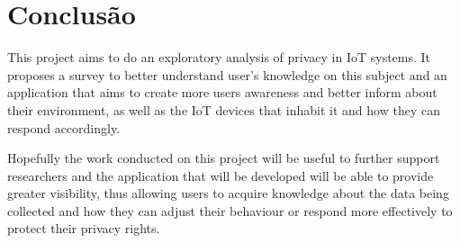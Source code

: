 \documentclass[conference]{IEEEtran}
\begin{document}
\section{Conclusão}

This project aims to do an exploratory analysis of privacy in IoT systems.
It proposes a survey to better understand user's knowledge on this subject
and an application that aims to create more users awareness and better inform
about their environment, as well as the IoT devices that inhabit it and
how they can respond accordingly.

Hopefully the work conducted on this project will be useful to further support
researchers and the application that will be developed will be able to
provide greater visibility, thus allowing users to acquire knowledge about
the data being collected and how they can adjust their behaviour or respond
more effectively to protect their privacy rights.



\end{document}
